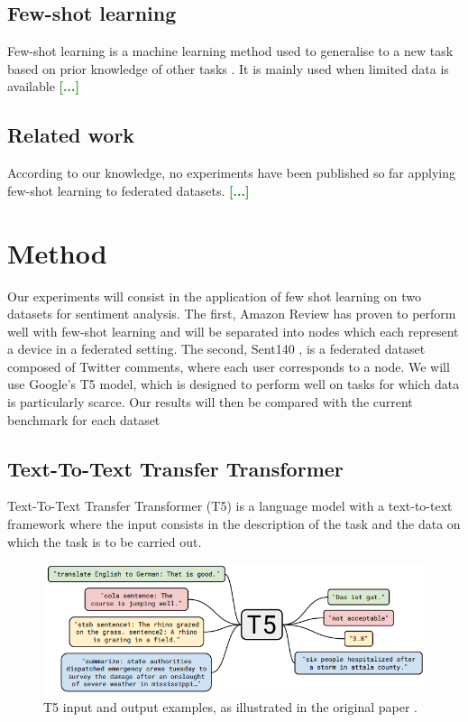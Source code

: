 \documentclass{esannV2}
\begin{document}
\subsection{Few-shot learning}
Few-shot learning is a machine learning method used to generalise to a new task based on prior knowledge of other tasks \cite{wang2020generalizing}. It is mainly used when limited data is available \textcolor{green}{\textbf{[...]}}

\subsection{Related work}
According to our knowledge, no experiments have been published so far applying few-shot learning to federated datasets. 
\textcolor{green}{\textbf{[...]}}

\section{Method}
Our experiments will consist in the application of few shot learning on two datasets for sentiment analysis. The first, Amazon Review \cite{keung2020multilingual} has proven to perform well with few-shot learning and will be separated into nodes which each represent a device in a federated setting. The second, Sent140 \cite{caldas2019leaf}, is a federated dataset composed of Twitter comments, where each user corresponds to a node. We will use Google's T5 model, which is designed to perform well on tasks for which data is particularly scarce. Our results will then be compared with the current benchmark for each dataset \textcolor{green}{\textbf{\cite{Bench1}}} \textcolor{green}{\textbf{\cite{Bench2}}}
 
\subsection{Text-To-Text Transfer Transformer}
Text-To-Text Transfer Transformer (T5) \cite{t5} is a language model with a text-to-text framework where the input consists in the description of the task and the data on which the task is to be carried out.

\begin{figure}[h]
\begin{center}
\includegraphics[width=\textwidth]{pics/T5.png}
\caption{T5 input and output examples, as illustrated in the original paper \cite{t5}.}
\label{fig:user}
\end{center}
\end{figure}
\end{document}
